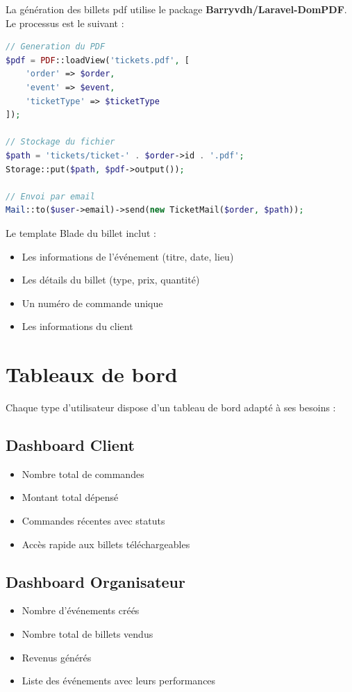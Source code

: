 \documentclass[a4paper,12pt,twoside]{report}
\begin{document}
La génération des billets \gls{pdf} utilise le package \textbf{Barryvdh/Laravel-DomPDF}. Le processus est le suivant :

\begin{lstlisting}[language=PHP,caption=Génération et envoi du billet PDF]
// Generation du PDF
$pdf = PDF::loadView('tickets.pdf', [
    'order' => $order,
    'event' => $event,
    'ticketType' => $ticketType
]);

// Stockage du fichier
$path = 'tickets/ticket-' . $order->id . '.pdf';
Storage::put($path, $pdf->output());

// Envoi par email
Mail::to($user->email)->send(new TicketMail($order, $path));
\end{lstlisting}

Le template Blade du billet inclut :
\begin{itemize}
    \item Les informations de l'événement (titre, date, lieu)
    \item Les détails du billet (type, prix, quantité)
    \item Un numéro de commande unique
    \item Les informations du client
\end{itemize}

\section{Tableaux de bord}

Chaque type d'utilisateur dispose d'un tableau de bord adapté à ses besoins :

\subsection{Dashboard Client}
\begin{itemize}
    \item Nombre total de commandes
    \item Montant total dépensé
    \item Commandes récentes avec statuts
    \item Accès rapide aux billets téléchargeables
\end{itemize}

\subsection{Dashboard Organisateur}
\begin{itemize}
    \item Nombre d'événements créés
    \item Nombre total de billets vendus
    \item Revenus générés
    \item Liste des événements avec leurs performances
\end{itemize}
\end{document}
